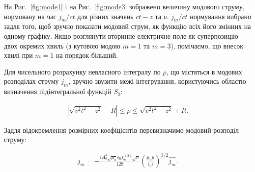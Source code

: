 На Рис.~\ref{fig:mode1} і на Рис.~\ref{fig:mode3} зображено величину модового 
струму, нормовану на час $ j_m / ct $ для різних значень $ ct-z $ та $ \nu $.
$ j_m / ct $ нормування вибрано задля того, щоб зручно показати модовий 
струм, як функцію всіх його змінних на одному графіку. Якщо розглянути вторинне
електричне поле як суперпозицію двох окремих хвиль (з кутовою модою $ m = 1 $ 
та $ m = 3 $), помічаємо, що внесок хвилі при $ m = 1 $ на порядок більший.

Для чисельного розрахунку невласного інтегралу по $ \rho $, що містяться в 
модових розподілах струму $ j_m $, зручно звузити межі інтегрування, 
користуючись областю визначення підінтегральної функцій $ S_2 $:

%
%
%
%
\begin{equation} \begin{aligned}
\left| \sqrt{v^2t^2 - z^2} - R \right| \leq \rho \leq \sqrt{v^2t^2 - z^2} + R.
\end{aligned} \end{equation}

Задля відокремлення розмірних коефіцієнтів перевизначимо модовий розподіл 
струму:

\begin{equation} \begin{aligned}
j_m = - \frac{i A_0^3 \sqrt{\mu_0} \epsilon_0 \chi_e^{(3)} \sqrt{\nu}}{128}
\left( \frac{\mu_0 \mu}{\epsilon_0 \epsilon} \right)^{3/2} \hat{j_m}.
\end{aligned} \end{equation}

